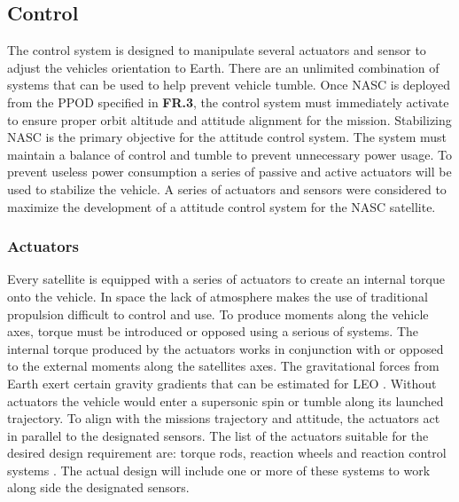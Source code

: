 \documentclass{ece}
\begin{document}
\subsection{Control}
 The control system is designed to manipulate several actuators and sensor to adjust the vehicles orientation to Earth. There are an unlimited combination of systems that can be used to help prevent vehicle tumble. Once NASC is deployed from the PPOD specified in \textbf{FR.3}, the control system must immediately activate to ensure proper orbit altitude and attitude alignment for the mission. Stabilizing NASC is the primary objective for the attitude control system. The system must maintain a balance of control and tumble to prevent unnecessary power usage. To prevent useless power consumption a series of passive and active actuators will be used to stabilize the vehicle. A series of actuators and sensors were considered to maximize the development of a attitude control system for the NASC satellite.
\subsubsection{Actuators}
Every satellite is equipped with a series of actuators to create an internal torque onto the vehicle. In space the lack of atmosphere makes the use of traditional propulsion difficult to control and use. To produce moments along the vehicle axes, torque must be introduced or opposed using a serious of systems. The internal torque produced by the actuators works in conjunction with or opposed to the external moments along the satellites axes. The gravitational forces from Earth exert certain gravity gradients that can be estimated for LEO \cite{AttSim}. Without actuators the vehicle would enter a supersonic spin or tumble along its launched trajectory. To align with the missions trajectory and attitude, the actuators act in parallel to the designated sensors. The list of the actuators suitable for the desired design requirement are: torque rods, reaction wheels and reaction control systems . The actual design will include one or more of these systems to work along side the designated sensors. 
%
\end{document}
